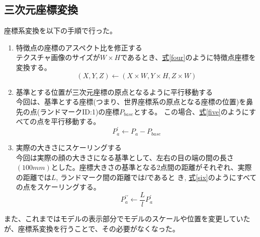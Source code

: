 \documentclass[]{jarticle}          %
\begin{document}
\subsection{三次元座標変換}
座標系変換を以下の手順で行った。
\begin{enumerate}
  \item 特徴点の座標のアスペクト比を修正する \\
        テクスチャ画像のサイズが$W\times{H}$であるとき、\hyperref[four]{式\ref{four}}のように特徴点座標を変換する。
        \begin{equation}
          (X,Y,Z){\leftarrow}(X\times{W},Y\times{H},Z\times{W})
          \label{four}
        \end{equation}
  \item 基準とする位置が三次元座標の原点となるように平行移動する \\
        今回は、基準とする座標(つまり、世界座標系の原点となる座標の位置)を鼻先の点(ランドマークID:1)の座標$P_{base}$とする。
        この場合、\hyperref[five]{式\ref{five}}のようにすべての点を平行移動する。
        \begin{equation}
          P_a^{\prime}{\leftarrow}P_a-P_{base}
          \label{five}
        \end{equation}        
  \item 実際の大きさにスケーリングする \\
        今回は実際の顔の大きさになる基準として、左右の目の端の間の長さ$(100mm)$とした。座標大きさの基準となる2点間の距離がそれぞれ、実際の距離では$L$, ランドマーク間の距離では$l$であると
        き, \hyperref[six]{式\ref{six}}のようにすべての点をスケーリングする。
        \begin{equation}
          P_a^{\prime\prime}{\leftarrow}\frac{L}{l}P_a^{\prime}
          \label{six}
        \end{equation}                
\end{enumerate}
また、これまではモデルの表示部分でモデルのスケールや位置を変更していたが、座標系変換を行うことで、その必要がなくなった。
\end{document}
